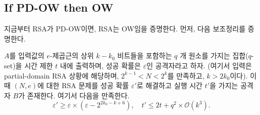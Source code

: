 

\subsection{If PD-OW then OW}

지금부터 RSA가 PD-OW이면, RSA는 OW임을 증명한다. 먼저, 다음 보조정리를 증명한다.

\begin{tcolorbox}[colback=white, sharp corners, boxrule=0.7pt]
    \begin{lemma}
        $A$를 입력값의 $e$-제곱근의 상위 $k-k_0$ 비트들을 포함하는 $q$ 개 원소를
        가지는 집합($q$-set)을 시간 제한 $t$ 내에 출력하며, 성공 확률은
        $\varepsilon$인 공격자라고 하자. (여기서 입력은 partial-domain RSA 상황에
        해당하며, $2^{k-1} < N < 2^k$를 만족하고, $k > 2k_0$이다). 이때 $(N,e)$에
        대한 RSA 문제를 성공 확률 $\varepsilon'$로 해결하고 실행 시간 $t'$을 가지는
        공격자 $B$가 존재한다. 여기서 다음을 만족한다.
        $$
            \varepsilon' \geq \varepsilon \times (\varepsilon - 2^{2k_0 - k + 6}), \quad 
            t' \leq 2t + q^2 \times \mathcal{O}(k^3).
        $$
    \end{lemma}
\end{tcolorbox}

